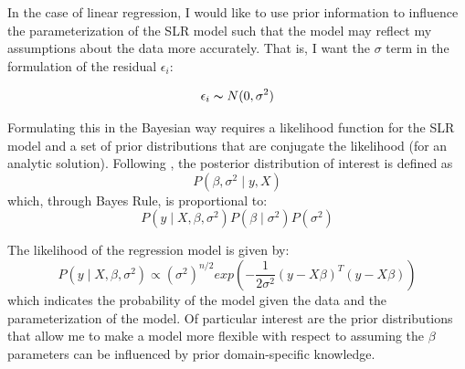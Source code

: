 \documentclass[10pt]{article}
\begin{document}
In the case of linear regression, I would like to use prior information to influence the parameterization of the SLR model such that the model may reflect my assumptions about the data more accurately. That is, I want the $\sigma$ term in the formulation of the residual $\epsilon_i$: 

$$ \epsilon_i \thicksim N(0, \sigma^2) $$
 
Formulating this in the Bayesian way requires a likelihood function for the SLR model and a set of prior distributions that are conjugate the likelihood (for an analytic solution). Following \cite{murphy2012machine}, the posterior distribution of interest is defined as 
$$ P(\beta, \sigma^2 \mid y, X) $$
which, through Bayes Rule, is proportional to:  
$$P(y \mid X, \beta, \sigma^2) P(\beta \mid \sigma^2) P(\sigma^2)$$

The likelihood of the regression model is given by: 
$$ P(y \mid X, \beta, \sigma^2) \propto (\sigma^2)^{n/2} exp(-\frac{1}{2\sigma^2}(y - X \beta)^T (y - X \beta))$$
which indicates the probability of the model given the data and the parameterization of the model. Of particular interest  are the prior distributions that allow me to make a model more flexible with respect to assuming the $\beta$ parameters can be influenced by prior domain-specific knowledge.
\end{document}
